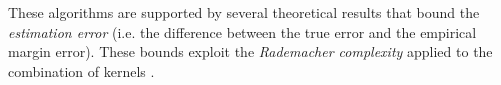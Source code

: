 \documentclass{esannV2}
\newcommand{\1}{{\bf 1}}
\begin{document}
These algorithms are supported by several theoretical results that bound the \emph{estimation error} (i.e. the difference between the true error and the empirical margin error). These bounds exploit the \emph{Rademacher complexity} applied to the combination of kernels \cite{Maurer2012,Cortes2009c}.%

%

\end{document}
